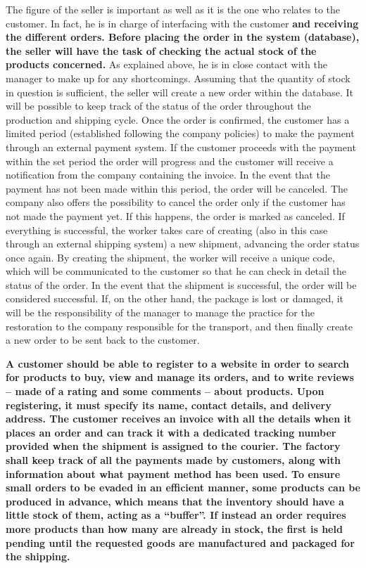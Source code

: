 The figure of the seller is important as well as it is the one who relates to the customer. In fact, he is in charge of interfacing with the customer \textbf{and receiving the different orders. Before placing the order in the system (database), the seller will have the task of checking the actual stock of the products concerned.} As explained above, he is in close contact with the manager to make up for any shortcomings. Assuming that the quantity of stock in question is sufficient, the seller will create a new order within the database. It will be possible to keep track of the status of the order throughout the production and shipping cycle. Once the order is confirmed, the customer has a limited period (established following the company policies) to make the payment through an external payment system. If the customer proceeds with the payment within the set period the order will progress and the customer will receive a notification from the company containing the invoice. In the event that the payment has not been made within this period, the order will be canceled. The company also offers the possibility to cancel the order only if the customer has not made the payment yet. If this happens, the order is marked as canceled. If everything is successful, the worker takes care of creating (also in this case through an external shipping system) a new shipment, advancing the order status once again. By creating the shipment, the worker will receive a unique code, which will be communicated to the customer so that he can check in detail the status of the order. In the event that the shipment is successful, the order will be considered successful. If, on the other hand, the package is lost or damaged, it will be the responsibility of the manager to manage the practice for the restoration to the company responsible for the transport, and then finally create a new order to be sent back to the customer.

\textbf{A customer should be able to register to a website in order to search for products to buy, view and manage its orders, and to write reviews -- made of a rating and some comments -- about products. Upon registering, it must specify its name, contact details, and delivery address. The customer receives an invoice with all the details when it places an order and can track it with a dedicated tracking number provided when the shipment is assigned to the courier. The factory shall keep track of all the payments made by customers, along with information about what payment method has been used. To ensure small orders to be evaded in an efficient manner, some products can be produced in advance, which means that the inventory should have a little stock of them, acting as a ``buffer''. If instead an order requires more products than how many are already in stock, the first is held pending until the requested goods are manufactured and packaged for the shipping.}


